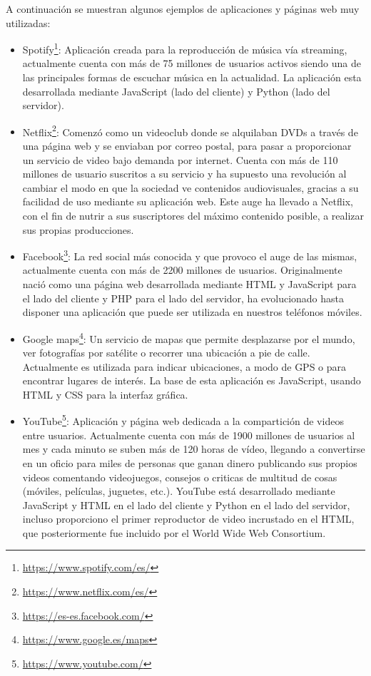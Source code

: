  A continuación se muestran algunos ejemplos de aplicaciones y páginas web muy utilizadas:
\begin{itemize}
\item Spotify\footnote{\url{https://www.spotify.com/es/}}: Aplicación creada para la reproducción de música vía streaming, actualmente cuenta con más de 75 millones de usuarios activos siendo una de las principales formas de escuchar música en la actualidad. La aplicación esta desarrollada mediante JavaScript (lado del cliente) y Python (lado del servidor).
\item Netflix\footnote{\url{https://www.netflix.com/es/}}: Comenzó como un videoclub donde se alquilaban DVDs a través de una página web y se enviaban por correo postal, para pasar a proporcionar un servicio de video bajo demanda por internet. Cuenta con más de 110 millones de usuario suscritos a su servicio y ha supuesto una revolución al cambiar el modo en que la sociedad ve contenidos audiovisuales, gracias a su facilidad de uso mediante su aplicación web. Este auge ha llevado a Netflix, con el fin de nutrir a sus suscriptores del máximo contenido posible, a realizar sus propias producciones. 
\item Facebook\footnote{\url{https://es-es.facebook.com/}}: La red social más conocida y que provoco el auge de las mismas, actualmente cuenta con más de 2200 millones de usuarios. Originalmente nació como una página web desarrollada mediante HTML y JavaScript para el lado del cliente y PHP para el lado del servidor, ha evolucionado hasta disponer una aplicación que puede ser utilizada en nuestros teléfonos móviles.
\item Google maps\footnote{\url{https://www.google.es/maps}}: Un servicio de mapas que permite desplazarse por el mundo, ver fotografías por satélite o recorrer una ubicación a pie de calle. Actualmente es utilizada para indicar ubicaciones, a modo de GPS o para encontrar lugares de interés. La base de esta aplicación es JavaScript, usando HTML y CSS para la interfaz gráfica.
\item YouTube\footnote{\url{https://www.youtube.com/}}: Aplicación y página web dedicada a la compartición de videos entre usuarios. Actualmente cuenta con más de 1900 millones de usuarios al mes y cada minuto se suben más de 120 horas de vídeo, llegando a convertirse en un oficio para miles de personas que ganan dinero publicando sus propios videos comentando videojuegos, consejos o criticas de multitud de cosas (móviles, películas, juguetes, etc.). YouTube está desarrollado mediante JavaScript y HTML en el lado del cliente y Python en el lado del servidor, incluso proporciono el primer reproductor de video incrustado en el HTML, que posteriormente fue incluido por el World Wide Web Consortium.

\end{itemize}
